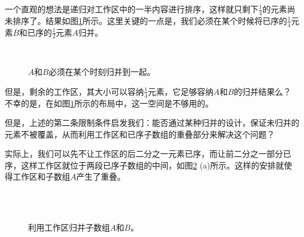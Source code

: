 \documentclass[UTF8]{article}
\begin{document}
一个直观的想法是递归对工作区中的一半内容进行排序，这样就只剩下$\frac{1}{4}$的元素尚未排序了。结果如图\ref{fig:merge-in-place-quater}所示。这里关键的一点是，我们必须在某个时候将已序的$\frac{1}{4}$元素$B$和已序的$\frac{1}{2}$元素$A$归并。

\begin{figure}[htbp]
 \centering
       \\
 \caption{$A$和$B$必须在某个时刻归并到一起。}
 \label{fig:merge-in-place-quater}
\end{figure}

但是，剩余的工作区，其大小可以容纳$\frac{1}{4}$元素，它足够容纳$A$和$B$的归并结果么？不幸的是，在如图\ref{fig:merge-in-place-quater}所示的布局中，这一空间是不够用的。

但是，上述的第二条限制条件启发我们：能否通过某种归并的设计，保证未归并的元素不被覆盖，从而利用工作区和已序子数组的重叠部分来解决这个问题？

实际上，我们可以先不让工作区的后二分之一元素已序，而让前二分之一部分已序，这样工作区就位于两段已序子数组的中间，如图\ref{fig:merge-in-place-setup} (a)所示。这样的安排就使得工作区和子数组$A$产生了重叠\cite{msort-in-place}。

\begin{figure}[htbp]
 \centering
  \\
  \\
 \caption{利用工作区归并子数组$A$和$B$。}
 \label{fig:merge-in-place-setup}
\end{figure}
\end{document}
